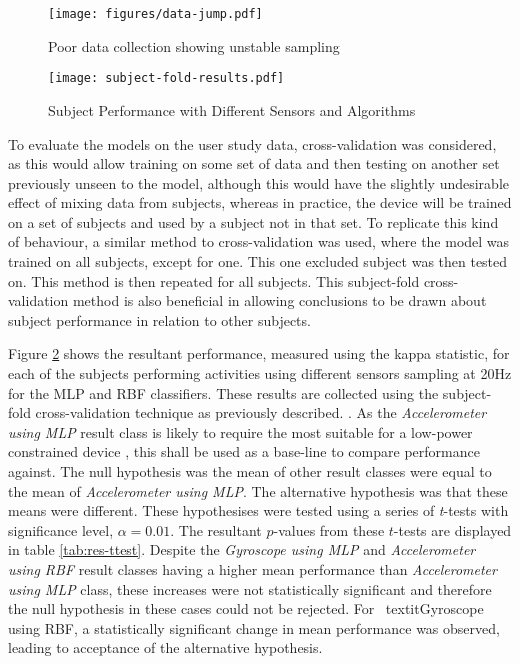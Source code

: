 \begin{figure}
	\centering
	\texttt{[image: figures/data-jump.pdf]}
	\caption{Poor data collection showing unstable sampling\label{fig:data-jump}}
\end{figure}

\begin{figure}
	\texttt{[image: subject-fold-results.pdf]}
	\caption{Subject Performance with Different Sensors and Algorithms \label{fig:subfold}}
\end{figure}

To evaluate the models on the user study data, cross-validation was considered, as this would allow training on some set of data and then testing on another set previously unseen to the model, although this would have the slightly undesirable effect of mixing data from subjects, whereas in practice, the device will be trained on a set of subjects and used by a subject not in that set. To replicate this kind of behaviour, a similar method to cross-validation was used, where the model was trained on all subjects, except for one. This one excluded subject was then tested on. This method is then repeated for all subjects. This subject-fold cross-validation method is also beneficial in allowing conclusions to be drawn about subject performance in relation to other subjects.

Figure \ref{fig:subfold} shows the resultant performance, measured using the kappa statistic, for each of the subjects performing activities using different sensors sampling at 20Hz for the MLP and RBF classifiers. These results are collected using the subject-fold cross-validation technique as previously described. . As the \textit{Accelerometer using MLP} result class is likely to require the most suitable for a low-power constrained device , this shall be used as a base-line to compare performance against. The null hypothesis was the mean of other result classes were equal to the mean of \textit{Accelerometer using MLP}. The alternative hypothesis was that these means were different. These hypothesises were tested using a series of \textit{t}-tests with significance level, $\alpha = 0.01$. The resultant $p$-values from these $t$-tests are displayed in table \ref{tab:res-ttest}. Despite the \textit{Gyroscope using MLP} and \textit{Accelerometer using RBF} result classes having a higher mean performance than \textit{Accelerometer using MLP} class, these increases were not statistically significant and therefore the null hypothesis in these cases could not be rejected. For \ textit{Gyroscope using RBF}, a statistically significant change in mean performance was observed, leading to acceptance of the alternative hypothesis.

